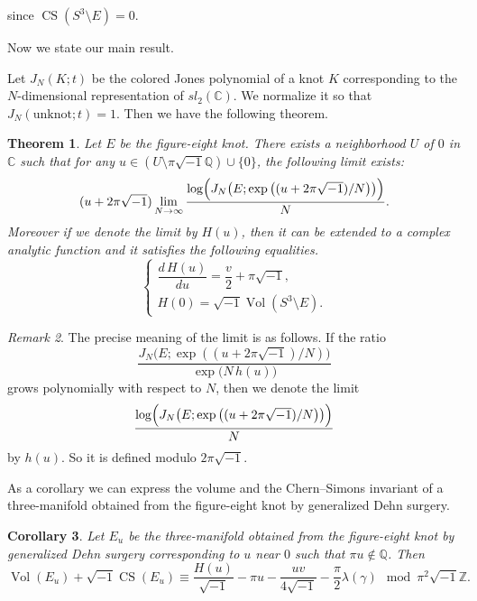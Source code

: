 \documentclass[a4paper]{amsart}
\theoremstyle{plain}
\newtheorem{thm}{Theorem}[section]
\newtheorem{cor}[thm]{Corollary}
\theoremstyle{definition}
\theoremstyle{remark}
\newtheorem{rem}[thm]{Remark}
\newcommand{\Z}{\mathbb{Z}}
\newcommand{\C}{\mathbb{C}}
\newcommand{\Q}{\mathbb{Q}}
\newcommand{\Vol}{\operatorname{Vol}}
\newcommand{\CS}{\operatorname{CS}}
\numberwithin{equation}{section}
\begin{document}
since $\CS\left(S^3\setminus{E}\right)=0$.
\par
Now we state our main result.
\par
Let $J_N(K;t)$ be the colored Jones polynomial of a knot $K$ corresponding
to the $N$-dimensional representation of $sl_2(\C)$.
We normalize it so that $J_N(\text{unknot};t)=1$.
Then we have the following theorem.
\begin{thm}\label{thm:main}
Let $E$ be the figure-eight knot.
There exists a neighborhood $U$ of $0$ in $\C$ such that for any
$u\in({U}\setminus\pi\sqrt{-1}\Q)\cup\{0\}$, the following limit exists:
\begin{equation*}
  (u+2\pi\sqrt{-1})
  \lim_{N\to\infty}
  \frac{\log\Bigl(J_N\bigl(E;\exp\left((u+2\pi\sqrt{-1})/N\right)\bigr)\Bigr)}
  {N}.
\end{equation*}
Moreover if we denote the limit by $H(u)$, then it can be extended to a complex
analytic function and it satisfies the following equalities.
\begin{equation*}
\begin{cases}
  \dfrac{d\,H(u)}{du}=\dfrac{v}{2}+\pi\sqrt{-1},
  \\[3mm]
  H(0)=\sqrt{-1}\Vol(S^3\setminus{E}).
\end{cases}
\end{equation*}
\end{thm}
\begin{rem}
The precise meaning of the limit is as follows.
If the ratio
\begin{equation*}
  \frac{J_N\bigl(E;\exp\left((u+2\pi\sqrt{-1})/N\right)\bigr)}
  {\exp\bigl(N\,h(u)\bigr)}
\end{equation*}
grows polynomially with respect to $N$, then we denote the limit
\begin{equation*}
  \frac{\log\Bigl(J_N\bigl(E;\exp\left((u+2\pi\sqrt{-1})/N\right)\bigr)\Bigr)}
  {N}
\end{equation*}
by $h(u)$.
So it is defined modulo $2\pi\sqrt{-1}$.
\end{rem}
As a corollary we can express the volume and the Chern--Simons invariant
of a three-manifold obtained from the figure-eight knot by generalized Dehn
surgery.
\begin{cor}\label{cor:Vol_CS}
Let $E_u$ be the three-manifold obtained from the figure-eight knot
by generalized Dehn surgery corresponding to $u$ near $0$ such that
$\pi{u}\notin\Q$.
Then
\begin{equation*}
  \Vol(E_u)+\sqrt{-1}\CS(E_u)
  \equiv
  \frac{H(u)}{\sqrt{-1}}-\pi{u}-\frac{uv}{4\sqrt{-1}}
  -\frac{\pi}{2}\lambda(\gamma)
  \mod{\pi^2\sqrt{-1}\Z}.
\end{equation*}
\end{cor}
\end{document}

